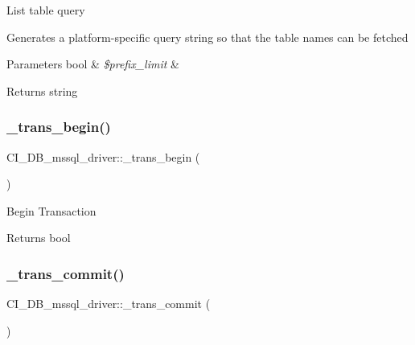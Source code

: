 List table query

Generates a platform-\/specific query string so that the table names can be fetched


\begin{DoxyParams}[1]{Parameters}
bool & {\em \$prefix\+\_\+limit} & \\
\hline
\end{DoxyParams}
\begin{DoxyReturn}{Returns}
string 
\end{DoxyReturn}
\mbox{\label{class_c_i___d_b__mssql__driver_a97bae3e33f7508e09118df5aa8f70bc8}} 
\subsubsection{\texorpdfstring{\+\_\+trans\+\_\+begin()}{\_trans\_begin()}}
{\footnotesize\ttfamily C\+I\+\_\+\+D\+B\+\_\+mssql\+\_\+driver\+::\+\_\+trans\+\_\+begin (\begin{DoxyParamCaption}{ }\end{DoxyParamCaption})\hspace{0.3cm}{\ttfamily [protected]}}

Begin Transaction

\begin{DoxyReturn}{Returns}
bool 
\end{DoxyReturn}
\mbox{\label{class_c_i___d_b__mssql__driver_a5a23831ee84e28b8e51387accc7baca3}} 
\subsubsection{\texorpdfstring{\+\_\+trans\+\_\+commit()}{\_trans\_commit()}}
{\footnotesize\ttfamily C\+I\+\_\+\+D\+B\+\_\+mssql\+\_\+driver\+::\+\_\+trans\+\_\+commit (\begin{DoxyParamCaption}{ }\end{DoxyParamCaption})\hspace{0.3cm}{\ttfamily [protected]}}


